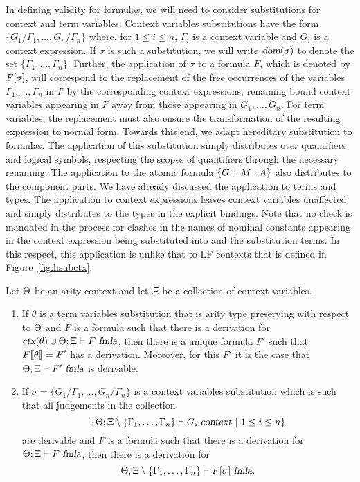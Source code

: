 In defining validity for formulas, we will need to consider
substitutions for context and term variables.
%
Context variables substitutions have the form
$\{G_1/\Gamma_1,\ldots,G_n/\Gamma_n\}$ where, for $1 \leq i \leq n$,
$\Gamma_i$ is a context variable and $G_i$ is a context expression. 
%
If $\sigma$ is such a substitution, we will write $\mbox{\sl dom}(\sigma)$ to
denote the set $\{\Gamma_1,\ldots,\Gamma_n\}$.
%
Further, the application of $\sigma$ to a formula
$F$, which is denoted by $F[\sigma]$, will correspond to the 
replacement of the free occurrences of the variables
$\Gamma_1,\ldots,\Gamma_n$ in $F$ by the corresponding context
expressions, renaming bound context variables appearing in $F$ away
from those appearing in $G_1,\ldots,G_n$.
%
For term variables, the replacement must also ensure the
transformation of the resulting expression to normal form.
%
Towards this end, we adapt hereditary substitution to formulas.
%
The application of this substitution simply distributes over
quantifiers and logical symbols, respecting the scopes of quantifiers
through the necessary renaming.
%
The application to the atomic formula $\left\{G \vdash M:A\right\}$ also distributes
to the component parts.
%
We have already discussed the application to terms and types.
%
The application to context expressions leaves context variables
unaffected and simply distributes to the types in the explicit
bindings.
%
Note that no check is mandated in the process for clashes in the names
of nominal constants appearing in the context expression being
substituted into and the substitution terms. 
%
In this respect, this application is unlike that to LF contexts
that is defined in Figure~\ref{fig:hsubctx}.


\begin{theorem}\label{th:subst-formula}
Let $\Theta$ be an arity context and let $\Xi$ be a collection of
context variables.
\begin{enumerate}
\item If $\theta$ is a term variables substitution that is arity type preserving with
respect to $\Theta$ and $F$ is a formula such that there is a
derivation for $\mbox{\sl ctx}(\theta) \uplus \Theta;\Xi \vdash F\ \mbox{\sl fmla}$,
then there is a unique formula $F'$ such that
$F\llbracket {\theta} \rrbracket_{} = F'$ has a derivation.
%
Moreover, for this $F'$ it is the case that
$\Theta;\Xi \vdash F'\ \mbox{\sl fmla}$ is derivable.  

\item If $\sigma=\{G_1/\Gamma_1,\ldots,G_n/\Gamma_n\}$ is a context variables
substitution which is such that all judgements in the collection
\[\left\{\wfctx{\STLCGamma}
             {\Xi\setminus\{\Gamma_1,\ldots,\Gamma_n\}}{G_i}\ |\ 
                    1\leq i\leq n\right\}\]
are derivable and $F$ is a formula such that there is a derivation for
$\Theta;\Xi \vdash F\ \mbox{\sl fmla}$, then there is a derivation for
\[\Theta;\Xi\setminus\{\Gamma_1,\ldots,\Gamma_n\} \vdash F[\sigma]\ \mbox{\sl fmla}.\]
\end{enumerate}
\end{theorem}

